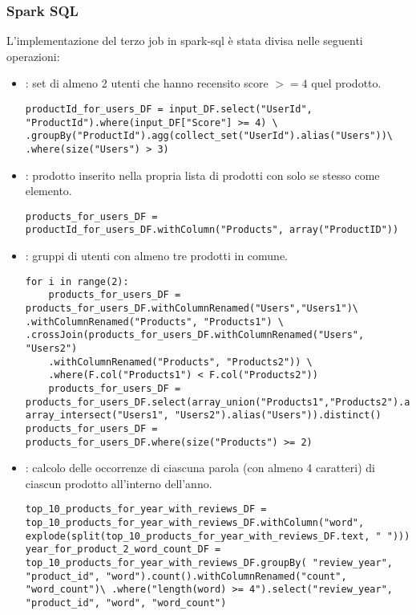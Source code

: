   \subsubsection{Spark SQL}
  L'implementazione del terzo job in spark-sql è stata divisa nelle seguenti operazioni:
  \begin{itemize}
    \item {}: set di almeno 2 utenti che hanno recensito score $>=4$ quel prodotto.
  \begin{lstlisting}[style=all, style=PythonStyle]
productId_for_users_DF = input_DF.select("UserId", "ProductId").where(input_DF["Score"] >= 4) \ .groupBy("ProductId").agg(collect_set("UserId").alias("Users"))\
.where(size("Users") > 3)
  \end{lstlisting}
    \item {}: prodotto inserito nella propria lista di prodotti con solo se stesso come elemento.
  \begin{lstlisting}[style=all, style=PythonStyle]
products_for_users_DF = productId_for_users_DF.withColumn("Products", array("ProductID"))
\end{lstlisting}
  \item {}: gruppi di utenti con almeno tre prodotti in comune.
     \begin{lstlisting}[style=all, style=PythonStyle]
for i in range(2):
    products_for_users_DF = products_for_users_DF.withColumnRenamed("Users","Users1")\ .withColumnRenamed("Products", "Products1") \ .crossJoin(products_for_users_DF.withColumnRenamed("Users", "Users2")
    .withColumnRenamed("Products", "Products2")) \
    .where(F.col("Products1") < F.col("Products2"))
    products_for_users_DF = products_for_users_DF.select(array_union("Products1","Products2").alias("Products"), array_intersect("Users1", "Users2").alias("Users")).distinct() products_for_users_DF = products_for_users_DF.where(size("Products") >= 2)
\end{lstlisting}

    \item {}: calcolo delle occorrenze di ciascuna parola (con almeno 4 caratteri) di ciascun prodotto all'interno dell'anno.
     \begin{lstlisting}[style=all, style=PythonStyle]
top_10_products_for_year_with_reviews_DF = top_10_products_for_year_with_reviews_DF.withColumn("word", explode(split(top_10_products_for_year_with_reviews_DF.text, " ")))
year_for_product_2_word_count_DF = top_10_products_for_year_with_reviews_DF.groupBy( "review_year", "product_id", "word").count().withColumnRenamed("count", "word_count")\ .where("length(word) >= 4").select("review_year", "product_id", "word", "word_count")
\end{lstlisting}


\end{itemize}
